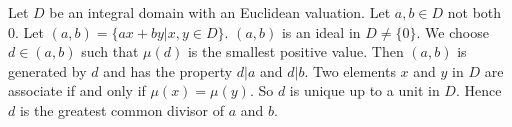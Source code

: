 \documentclass[12pt]{article}
\begin{document}
Let $D$ be an integral domain with an Euclidean valuation. Let $a,b \in D$ not both 0. Let $(a,b) =\{ax +by \vert x,y \in D\}$. $(a,b)$ is an ideal in $D \ne \{0\}$. We choose $d \in (a,b)$ such that $\mu(d)$ is the smallest positive value. Then $(a,b)$ is generated by $d$ and has the property $d \vert a$ and $d \vert b$. Two elements $x$ and $y$ in $D$ are associate if and only if $\mu(x) =\mu(y)$. So $d$ is unique up to a unit in $D$. Hence $d$ is the greatest common divisor of $a$ and $b$.
\end{document}
